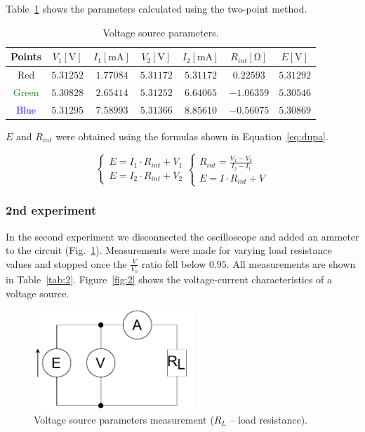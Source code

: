Table~\ref{tab:voltage_2point} shows the parameters calculated using the two-point method.

\begin{table}[H]
	\centering
	\begin{tabular}{  c | c | c | c | c | c | c}
		Points & $V_1 [\unit{\volt}]$ & $I_1 [\unit{\milli\ampere}]$ & $V_2 [\unit{\volt}]$ & $I_2 [\unit{\milli\ampere}]$ & $R_{int} [\unit{\ohm}]$ & $E [\unit{\volt}]$ \\
		\hline
		\textcolor{BrickRed}{Red} & $5.31252$ & $1.77084$ & $5.31172$ & $5.31172$ & $0.22593$ & $5.31292$ \\
		\textcolor{ForestGreen}{Green} & $5.30828$ & $2.65414$ & $5.31252$ & $6.64065$ & $-1.06359$ & $5.30546$ \\
		\textcolor{blue}{Blue} & $5.31295$ & $7.58993$ & $5.31366$ & $8.85610$ & $-0.56075$ & $5.30869$ \\
	\end{tabular}
	\caption{Voltage source parameters.}
	\label{tab:voltage_2point}
\end{table}

$E$ and $R_{int}$ were obtained using the formulas shown in Equation~\ref{eq:dupa}.

\begin{equation}
	\begin{cases}
			E = I_1\cdot R_{int} + V_1\\
			E = I_2\cdot R_{int} + V_2
	\end{cases}
	\begin{cases}
		R_{int} = \frac{V_1-V_2}{I_2-I_1}\\
		E = I\cdot R_{int} + V
	\end{cases}
	\label{eq:dupa}
\end{equation}


\subsubsection*{2nd experiment}

In the second experiment we disconnected the oscilloscope and added an ammeter to the circuit (Fig.~\ref{fig:voltage}). Measurements were made for varying load resistance values and stopped once the $\frac{V}{V_o}$ ratio fell below $0.95$. All measurements are shown in Table~\ref{tab:2}. Figure~\ref{fig:2} shows the voltage-current characteristics of a voltage source. 

\begin{figure}[H]
	\centering
	\includegraphics[width=6cm]{schematics/2.pdf}
	\caption{Voltage source parameters measurement ($R_L$ -- load resistance).}
	\label{fig:voltage}
\end{figure}

